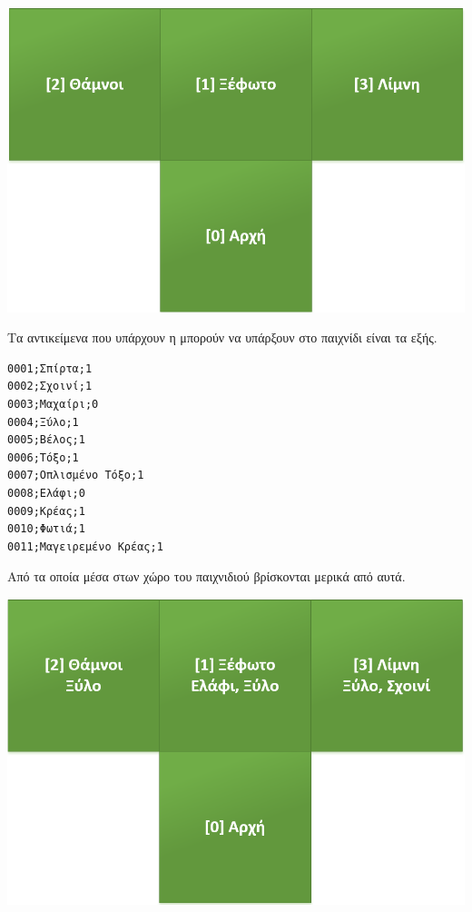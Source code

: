 \begin{center}
			\includegraphics[width=1\textwidth]{image/1.2.PNG}		
\end{center}

\noindent
Τα αντικείμενα που υπάρχουν η μπορούν να υπάρξουν στο παιχνίδι είναι τα εξής.

\begin{center}
	\begin{lstlisting}	
0001;Σπίρτα;1
0002;Σχοινί;1
0003;Μαχαίρι;0
0004;Ξύλο;1
0005;Βέλος;1
0006;Τόξο;1
0007;Οπλισμένο Τόξο;1
0008;Ελάφι;0
0009;Κρέας;1
0010;Φωτιά;1
0011;Μαγειρεμένο Κρέας;1
	\end{lstlisting}	
\end{center}

\noindent
Από τα οποία μέσα στων χώρο του παιχνιδιού βρίσκονται μερικά από αυτά.

\begin{center}
			\includegraphics[width=1\textwidth]{image/1.3.PNG}		
\end{center}


